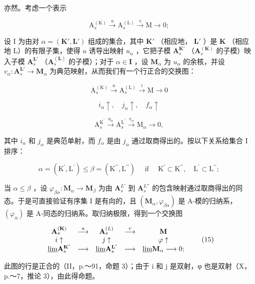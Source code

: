 亦然。考虑一个表示

\[
\mathrm{A} _ {s} ^ {(\mathrm{K})} \xrightarrow {u} \mathrm{A} _ {s} ^ {(\mathrm{L})} \xrightarrow {v} \mathrm{M} \longrightarrow 0;
\]

设 I 为由对 \(\alpha = (\mathbf{K}', \mathbf{L}')\) 组成的集合，其中 \(\mathbf{K}'\) （相应地， \(\mathbf{L}'\) ）是 \(\mathbf{K}\) （相应地 L）的有限子集，使得 \(u\) 诱导出映射 \(u_{\alpha}\) ，它把子模 \(\mathbf{A}_s^{\mathbf{K}'}\) （\(\mathbf{A}_s^{(\mathbf{K})}\) 的子模）映入子模 \(\mathbf{A}_s^{\mathbf{L}'}\) （\(\mathbf{A}_s^{(\mathbf{L})}\) 的子模）；对于 \(\alpha \in \mathbf{I}\) ，设 \(\mathbf{M}_{\alpha}\) 为 \(u_{\alpha}\) 的余核，并设 \(v_{\alpha}: \mathbf{A}_s^{\mathbf{L}'} \to \mathbf{M}_{\alpha}\) 为典范映射，从而我们有一个行正合的交换图：

\[
\mathrm{A} _ {s} ^ {(\mathrm{K})} \xrightarrow {u} \mathrm{A} _ {s} ^ {(\mathrm{L})} \xrightarrow {i} \mathrm{M} \longrightarrow 0
\]

\[
i _ {\alpha} \uparrow , \quad j _ {\alpha} \uparrow , \quad f _ {\alpha} \uparrow
\]

\[
\mathrm{A} _ {s} ^ {\mathrm{K} ^ {\prime}} \xrightarrow {u _ {\alpha}} \mathrm{A} _ {s} ^ {\mathrm{L} ^ {\prime}} \xrightarrow {v _ {\alpha}} \mathrm{M} _ {\alpha} \longrightarrow 0,
\]

其中 \(i_{\alpha}\) 和 \(j_{\alpha}\) 是典范单射，而 \(f_{\alpha}\) 是由 \(j_{\alpha}\) 通过取商得出的。按以下关系给集合 I 排序：

\[
\alpha = \left(\mathrm{K} ^ {\prime}, \mathrm{L} ^ {\prime}\right) \leqslant \beta = \left(\mathrm{K} ^ {\prime \prime}, \mathrm{L} ^ {\prime \prime}\right) \quad \text { if } \quad \mathrm{K} ^ {\prime} \subset \mathrm{K} ^ {\prime \prime}, \quad \mathrm{L} ^ {\prime} \subset \mathrm{L} ^ {\prime \prime};
\]

当 \(\alpha \leqslant \beta\) ，设 \(\varphi_{\beta \alpha}: \mathbf{M}_{\alpha} \to \mathbf{M}_{\beta}\) 为由 \(\mathbf{A}_s^{L'}\) 到 \(\mathbf{A}_s^{L''}\) 的包含映射通过取商得出的同态。于是可直接验证有序集 I 是有向的，且 \((\mathbf{M}_{\alpha}, \varphi_{\beta \alpha})\) 是 A-模的归纳系， \((\varphi_{\alpha})\) 是 A-同态的归纳系。取归纳极限，得到一个交换图

\[
\begin{array}{c c c c c} \mathbf {A} _ {s} ^ {(\mathbf {K})} & \stackrel {{u}} {{\longrightarrow}} & \mathbf {A} _ {s} ^ {(L)} & \stackrel {{v}} {{\longrightarrow}} & \mathbf {M} \\ i \uparrow & & j \uparrow & & \varphi \uparrow \\ \underline {{\lim}} \mathbf {A} _ {s} ^ {\mathbf {K} ^ {\prime}} & \longrightarrow & \underline {{\lim}} \mathbf {A} _ {s} ^ {\mathbf {L} ^ {\prime}} & \longrightarrow & \underline {{\lim}} \mathbf {M} _ {\alpha} \longrightarrow 0; \end{array}\tag{15}
\]

此图的行是正合的（II，p.～91，命题 3）；由于 i 和 j 是双射，φ 也是双射（X，p.～7，推论 3），由此得命题。

